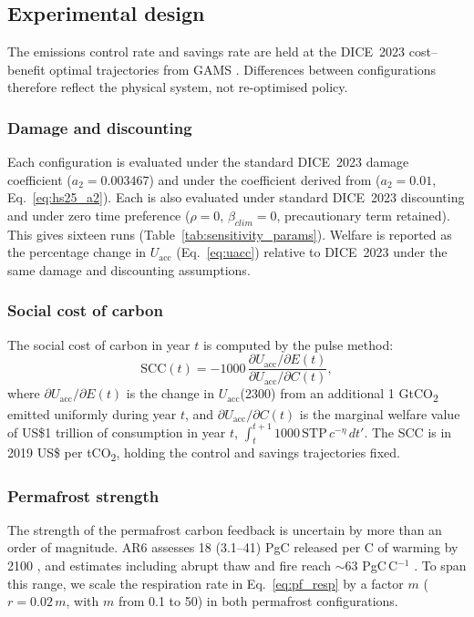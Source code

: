 \subsection{Experimental design}
The emissions control rate and savings rate are held at the DICE~2023 cost--benefit optimal trajectories from GAMS \citep{barragePoliciesProjectionsSocial2024}. Differences between configurations therefore reflect the physical system, not re-optimised policy.

\subsubsection{Damage and discounting}
Each configuration is evaluated under the standard DICE~2023 damage coefficient ($a_2 = 0.003467$) and under the coefficient derived from \citet{howardMethodologyMattersCareful2025} ($a_2 = 0.01$, Eq.~\ref{eq:hs25_a2}). Each is also evaluated under standard DICE~2023 discounting and under zero time preference ($\rho = 0$, $\beta_{clim} = 0$, precautionary term retained). This gives sixteen runs (Table~\ref{tab:sensitivity_params}). Welfare is reported as the percentage change in $U_{\text{acc}}$ (Eq.~\ref{eq:uacc}) relative to DICE~2023 under the same damage and discounting assumptions.

\subsubsection{Social cost of carbon}
The social cost of carbon in year $t$ is computed by the pulse method:
\begin{equation}
\text{SCC}(t) = -1000\,\frac{\partial U_{\text{acc}}/\partial E(t)}{\partial U_{\text{acc}}/\partial C(t)},
\label{eq:scc}
\end{equation}
where $\partial U_{\text{acc}}/\partial E(t)$ is the change in $U_{\text{acc}}$(2300) from an additional 1 GtCO\textsubscript{2} emitted uniformly during year $t$, and $\partial U_{\text{acc}}/\partial C(t)$ is the marginal welfare value of US\$1 trillion of consumption in year $t$, $\int_t^{t+1} 1000\,\text{STP}\,c^{-\eta}\,dt'$. The SCC is in 2019 US\$ per tCO\textsubscript{2}, holding the control and savings trajectories fixed.

\subsubsection{Permafrost strength}
The strength of the permafrost carbon feedback is uncertain by more than an order of magnitude. AR6 assesses 18 (3.1--41) PgC released per \textdegree C of warming by 2100 \citep{canadellGlobalCarbonOther2021}, and estimates including abrupt thaw and fire reach ${\sim}63$ PgC\,\textdegree C$^{-1}$ \citep{schadelPermafrostWildfireCarbon2026}. To span this range, we scale the respiration rate in Eq.~\ref{eq:pf_resp} by a factor $m$ ($r = 0.02\,m$, with $m$ from 0.1 to 50) in both permafrost configurations.

